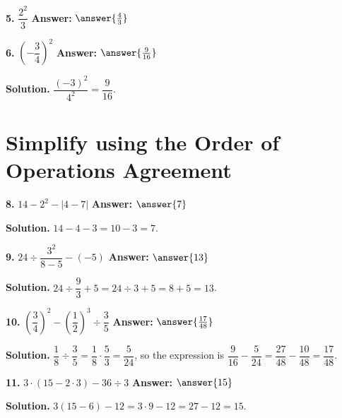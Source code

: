 \documentclass{ximera}
\begin{document}
\begin{problem}
\textbf{5.} $\dfrac{2^{2}}{3}$ \qquad \textbf{Answer:} $\answer{\frac{4}{3}}$
\end{problem}

\begin{problem}
\textbf{6.} $\left(-\dfrac{3}{4}\right)^{2}$ \qquad
\textbf{Answer:} $\answer{\frac{9}{16}}$

\begin{hint}
\textbf{Solution.} $\dfrac{(-3)^{2}}{4^{2}}=\dfrac{9}{16}$.
\end{hint}
\end{problem}

\section*{Simplify using the Order of Operations Agreement}

\begin{problem}
\textbf{8.} $14-2^{2}-|4-7|$ \qquad \textbf{Answer:} $\answer{7}$

\begin{hint}
\textbf{Solution.} $14-4-3=10-3=7$.
\end{hint}
\end{problem}

\begin{problem}
\textbf{9.} $24 \div \dfrac{3^{2}}{8-5}-(-5)$ \qquad \textbf{Answer:} $\answer{13}$

\begin{hint}
\textbf{Solution.} $24 \div \dfrac{9}{3}+5 = 24 \div 3+5 = 8+5 = 13$.
\end{hint}
\end{problem}

\begin{problem}
\textbf{10.} $\left(\dfrac{3}{4}\right)^{2}-\left(\dfrac{1}{2}\right)^{3} \div \dfrac{3}{5}$
\qquad \textbf{Answer:} $\answer{\frac{17}{48}}$

\begin{hint}
\textbf{Solution.} $\dfrac{1}{8}\div\dfrac{3}{5}=\dfrac{1}{8}\cdot\dfrac{5}{3}=\dfrac{5}{24}$,
so the expression is
$\dfrac{9}{16}-\dfrac{5}{24}=\dfrac{27}{48}-\dfrac{10}{48}=\dfrac{17}{48}$.
\end{hint}
\end{problem}

\begin{problem}
\textbf{11.} $3\cdot(15-2\cdot 3)-36 \div 3$ \qquad \textbf{Answer:} $\answer{15}$

\begin{hint}
\textbf{Solution.} $3(15-6)-12 = 3\cdot 9-12 = 27-12 = 15$.
\end{hint}
\end{problem}
\end{document}
